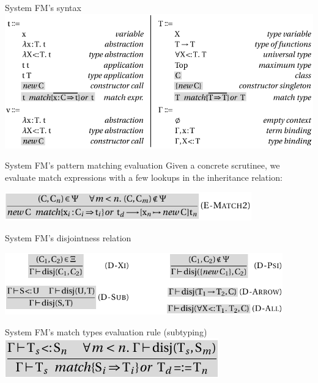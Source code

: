 \documentclass[10pt]{beamer}
\newenvironment{slide}[2][]
  {\begin{frame}[fragile,environment=slide,#1]{#2}}
  {\end{frame}}
\begin{document}
\begin{slide}{System FM's syntax}
\includegraphics[width=\textwidth]{figures/FMSyntax.pdf}
\end{slide}

\begin{slide}{System FM's pattern matching evaluation}
Given a concrete scrutinee, we evaluate match expressions with a few lookups in the inheritance relation:
\begin{center}
\includegraphics[width=0.8\textwidth]{figures/FMEMatch.pdf}
\end{center}
\end{slide}

\begin{slide}{System FM's disjointness relation}
\begin{center}
\includegraphics[width=0.9\textwidth]{figures/FMDisjointness.pdf}
\end{center}
\end{slide}

\begin{slide}{System FM's match types evaluation rule (subtyping)}
\includegraphics[width=\textwidth]{figures/FMSMatch.pdf}
\end{slide}
\end{document}
